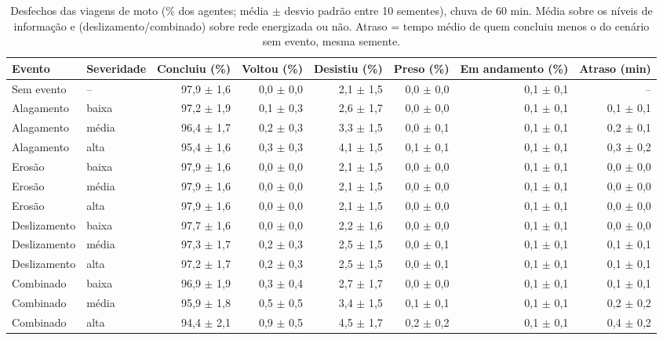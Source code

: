 \begin{table}[htbp]
\centering
\scriptsize
\caption{Desfechos das viagens de moto (\% dos agentes; média $\pm$ desvio padrão entre 10 sementes), chuva de 60 min. Média sobre os níveis de informação e (deslizamento/combinado) sobre rede energizada ou não. Atraso = tempo médio de quem concluiu menos o do cenário sem evento, mesma semente.}
\label{tab:t1_60_moto}
\begin{tabular}{llrrrrrr}
\toprule
Evento & Severidade & Concluiu (\%) & Voltou (\%) & Desistiu (\%) & Preso (\%) & Em andamento (\%) & Atraso (min) \\
\midrule
Sem evento & -- & 97,9 $\pm$ 1,6 & 0,0 $\pm$ 0,0 & 2,1 $\pm$ 1,5 & 0,0 $\pm$ 0,0 & 0,1 $\pm$ 0,1 & -- \\
Alagamento & baixa & 97,2 $\pm$ 1,9 & 0,1 $\pm$ 0,3 & 2,6 $\pm$ 1,7 & 0,0 $\pm$ 0,0 & 0,1 $\pm$ 0,1 & 0,1 $\pm$ 0,1 \\
Alagamento & média & 96,4 $\pm$ 1,7 & 0,2 $\pm$ 0,3 & 3,3 $\pm$ 1,5 & 0,0 $\pm$ 0,1 & 0,1 $\pm$ 0,1 & 0,2 $\pm$ 0,1 \\
Alagamento & alta & 95,4 $\pm$ 1,6 & 0,3 $\pm$ 0,3 & 4,1 $\pm$ 1,5 & 0,1 $\pm$ 0,1 & 0,1 $\pm$ 0,1 & 0,3 $\pm$ 0,2 \\
Erosão & baixa & 97,9 $\pm$ 1,6 & 0,0 $\pm$ 0,0 & 2,1 $\pm$ 1,5 & 0,0 $\pm$ 0,0 & 0,1 $\pm$ 0,1 & 0,0 $\pm$ 0,0 \\
Erosão & média & 97,9 $\pm$ 1,6 & 0,0 $\pm$ 0,0 & 2,1 $\pm$ 1,5 & 0,0 $\pm$ 0,0 & 0,1 $\pm$ 0,1 & 0,0 $\pm$ 0,0 \\
Erosão & alta & 97,9 $\pm$ 1,6 & 0,0 $\pm$ 0,0 & 2,1 $\pm$ 1,5 & 0,0 $\pm$ 0,0 & 0,1 $\pm$ 0,1 & 0,0 $\pm$ 0,0 \\
Deslizamento & baixa & 97,7 $\pm$ 1,6 & 0,0 $\pm$ 0,0 & 2,2 $\pm$ 1,6 & 0,0 $\pm$ 0,0 & 0,1 $\pm$ 0,1 & 0,0 $\pm$ 0,0 \\
Deslizamento & média & 97,3 $\pm$ 1,7 & 0,2 $\pm$ 0,3 & 2,5 $\pm$ 1,5 & 0,0 $\pm$ 0,1 & 0,1 $\pm$ 0,1 & 0,1 $\pm$ 0,1 \\
Deslizamento & alta & 97,2 $\pm$ 1,7 & 0,2 $\pm$ 0,3 & 2,5 $\pm$ 1,5 & 0,0 $\pm$ 0,1 & 0,1 $\pm$ 0,1 & 0,1 $\pm$ 0,1 \\
Combinado & baixa & 96,9 $\pm$ 1,9 & 0,3 $\pm$ 0,4 & 2,7 $\pm$ 1,7 & 0,0 $\pm$ 0,0 & 0,1 $\pm$ 0,1 & 0,1 $\pm$ 0,1 \\
Combinado & média & 95,9 $\pm$ 1,8 & 0,5 $\pm$ 0,5 & 3,4 $\pm$ 1,5 & 0,1 $\pm$ 0,1 & 0,1 $\pm$ 0,1 & 0,2 $\pm$ 0,2 \\
Combinado & alta & 94,4 $\pm$ 2,1 & 0,9 $\pm$ 0,5 & 4,5 $\pm$ 1,7 & 0,2 $\pm$ 0,2 & 0,1 $\pm$ 0,1 & 0,4 $\pm$ 0,2 \\
\bottomrule
\end{tabular}
\end{table}
